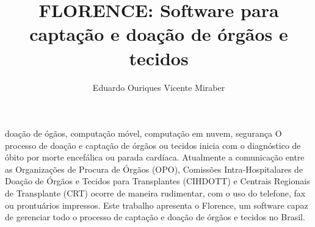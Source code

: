 \documentclass[portuguese,oneside]{tcc}
\author{Eduardo Ouriques \linebreak  Vicente Miraber}
\title{FLORENCE: Software para captação e doação de órgãos e tecidos}
      {FLORENCE: Software for capture and donation of organs and tissues}
\begin{document}






\begin{resumo}{doação de ógãos, computação móvel, computação em nuvem, segurança}
O processo de doação e captação de órgãos ou tecidos inicia com o diagnóstico de óbito por morte encefálica ou parada cardíaca. Atualmente a comunicação entre as Organizações de Procura de Órgãos (OPO), Comissões Intra-Hospitalares de Doação de Órgãos e Tecidos para Transplantes (CIHDOTT) e Centrais Regionais de Transplante (CRT) ocorre de maneira rudimentar, com o uso do telefone, fax ou prontuários impressos. Este trabalho apresenta o Florence, um software capaz de gerenciar todo o processo de captação e doação de órgãos e tecidos no Brasil.


\end{resumo}
\end{document}
